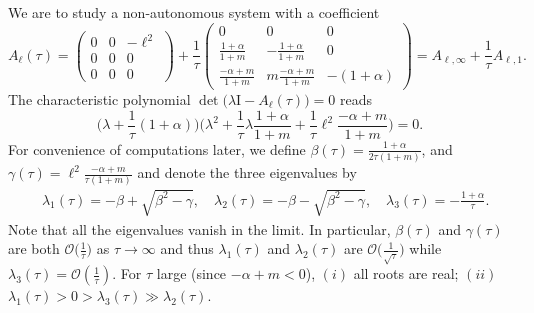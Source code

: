 \documentclass[a4paper,11pt]{article}
\def\l{{\ell}}
\theoremstyle{remark}
\begin{document}
We are to study a non-autonomous system with a coefficient
\begin{equation} \label{eq:n0A}
  A_\ell(\tau)=\begin{pmatrix}
   0 & 0 & -\l^2\\
   0 & 0 & 0\\
   0 & 0 & 0
  \end{pmatrix}
  + \frac{1}{\tau}   \begin{pmatrix}
   0 & 0 & 0\\
   \frac{1+\alpha}{1+m} & -\frac{1+\alpha}{1+m} & 0\\
   \frac{-\alpha+m}{1+m} & m\frac{-\alpha+m}{1+m}& -(1+\alpha)
  \end{pmatrix} = A_{\ell,\infty} + \frac{1}{\tau}A_{\ell,1}.
\end{equation}
The characteristic polynomial $\det\big(\lambda \textrm{I} - A_\ell(\tau)\big)=0$ reads
$$ \Big(\lambda +\frac{1}{\tau}(1+\alpha)\Big)\Big( \lambda^2 + \frac{1}{\tau}\lambda \frac{1+\alpha}{1+m} + \frac{1}{\tau} \l^2 \frac{-\alpha+m}{1+m}\Big)=0.$$
For convenience of computations later, we define $\beta(\tau) = \frac{1+\alpha}{2\tau(1+m)}$, and $\gamma(\tau)= \l^2\frac{-\alpha+m}{\tau(1+m)}$ and denote the three eigenvalues by
\begin{equation} \label{eq:inviscid_roots}
\begin{aligned}
 &\lambda_1(\tau) = -\beta + \sqrt{\beta^2-\gamma}, \quad \lambda_2(\tau) = -\beta - \sqrt{\beta^2-\gamma}, \quad \lambda_3(\tau) = -\frac{1+\alpha}{\tau}.
\end{aligned}
\end{equation}
Note that all the eigenvalues vanish in the limit. In particular, $\beta(\tau)$ and $\gamma(\tau)$ are both $\mathcal{O}\big(\frac{1}{\tau}\big)$ as $\tau \rightarrow \infty$ and thus $\lambda_1(\tau)$ and $\lambda_2(\tau)$  are $\mathcal{O}\big(\frac{1}{\sqrt{\tau}}\big)$ while $\lambda_3(\tau)=\mathcal{O}(\frac{1}{\tau})$. For $\tau$ large (since $-\alpha+m<0$), $(i)$ all roots are real; $(ii)$ $\lambda_1(\tau) > 0 > \lambda_3(\tau) \gg \lambda_2(\tau)$. %
\end{document}
